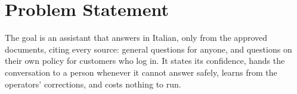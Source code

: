 

\section*{Problem Statement}

The goal is an assistant that answers in Italian, only from the approved documents, citing every
source: general questions for anyone, and questions on their own policy for customers who log in.
It states its confidence, hands the conversation to a person whenever it cannot answer safely,
learns from the operators' corrections, and costs nothing to run.



\endgroup
